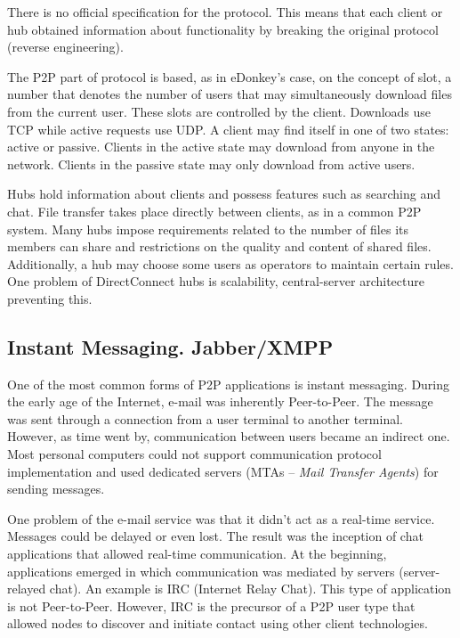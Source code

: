 There is no official specification for the protocol. This means that each
client or hub obtained information about functionality by breaking the
original protocol (reverse engineering).

The P2P part of protocol is based, as in eDonkey's case, on the concept of
slot, a number that denotes the number of users that may simultaneously
download files from the current user. These slots are controlled by the
client. Downloads use TCP while active requests use UDP. A client may find
itself in one of two states: active or passive. Clients in the active state may
download from anyone in the network. Clients in the passive state may
only download from active users.

Hubs hold information about clients and possess features such as searching and
chat. File transfer takes place directly between clients, as in a common P2P
system. Many hubs impose requirements related to the number of files its
members can share and restrictions on the quality and content of shared
files. Additionally, a hub may choose some users as operators to maintain
certain rules. One problem of DirectConnect hubs is scalability,
central-server architecture preventing this.

\subsection{Instant Messaging. Jabber/XMPP}

One of the most common forms of P2P applications is instant messaging. During
the early age of the Internet, e-mail was inherently Peer-to-Peer. The message
was sent through a connection from a user terminal to another terminal.
However, as time went by, communication between users became an indirect one. Most
personal computers could not support communication protocol implementation and used dedicated
servers (MTAs -- \textit{Mail Transfer Agents}) for sending messages.

One problem of the e-mail service was that it didn't act as a real-time service.
Messages could be delayed or even lost. The result was the inception of
chat applications that allowed real-time communication. At the beginning,
applications emerged in which communication was mediated by servers
(server-relayed chat). An example is IRC (Internet Relay Chat). This type of
application is not Peer-to-Peer. However, IRC is the precursor of a P2P user type
that allowed nodes to discover and initiate contact using other client
technologies.

